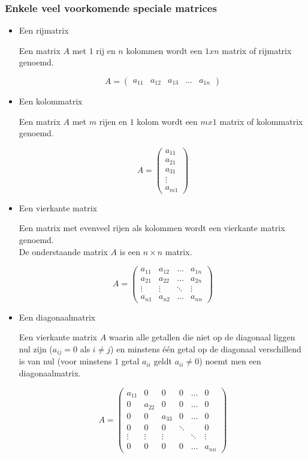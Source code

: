 \subsubsection{Enkele veel voorkomende speciale matrices}

\begin{itemize}
\item{Een rijmatrix}

Een matrix $A$ met $1$ rij en $n$ kolommen wordt een $1xn$ matrix of rijmatrix genoemd.

\[
A= \left( \begin{matrix}
a_{11} & a_{12} & a_{13} & \ldots & a_{1n}
\end{matrix} \right)
\]

\item{Een kolommatrix}

Een matrix $A$ met $m$ rijen en $1$ kolom wordt een $mx1$ matrix of kolommatrix genoemd.

\[
A= \left( \begin{matrix}
a_{11} \\
a_{21} \\
a_{31} \\
\vdots \\
a_{m1}
\end{matrix} \right)
\]

\item{Een vierkante matrix}

Een matrix met evenveel rijen als kolommen wordt een vierkante matrix genoemd.\\ De onderstaande matrix $A$ is een $n \times n$ matrix.

\[
A= \left( \begin{matrix}
a_{11} & a_{12} & \ldots & a_{1n} \\
a_{21} & a_{22} & \ldots & a_{2n} \\
\vdots & \vdots & \ddots & \vdots \\
a_{n1} & a_{n2} & \ldots & a_{nn}
\end{matrix} \right)
\]

\item{Een diagonaalmatrix}

Een vierkante matrix $A$ waarin alle getallen die niet op de diagonaal liggen nul zijn ($a_{ij}=0$ als $i \neq j$) en minstens \'{e}\'{e}n getal op de diagonaal verschillend is van nul (voor minstens $1$ getal $a_{ii}$ geldt $a_{ii} \neq 0$) noemt men een diagonaalmatrix.

\[
A= \left( \begin{matrix}
a_{11} & 0 & 0 & 0 & \ldots & 0 \\
0  & a_{22} & 0 & 0 & \ldots & 0 \\
0 & 0 & a_{33} & 0 & \ldots & 0 \\
0 & 0 & 0 & \ddots &  & 0 \\
\vdots & \vdots & \vdots &  & \ddots & \vdots \\
0 & 0 & 0 & 0 & \ldots & a_{nn}
\end{matrix} \right)
\]


\end{itemize}
